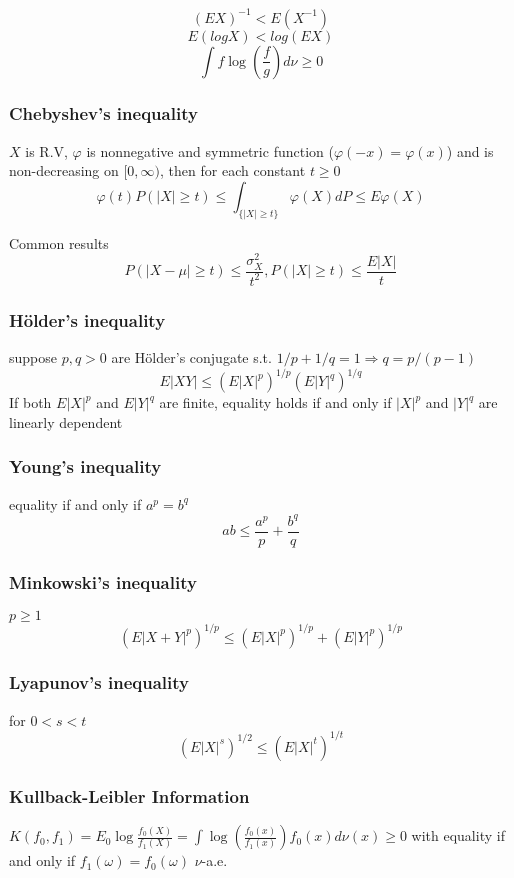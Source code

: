 $$(EX)^{-1} < E(X^{-1})$$
$$E(logX)<log(EX)$$
$$
\int f\log\left(\frac{f}{g}\right)d\nu \geq 0
$$

\subsubsection{Chebyshev's inequality}
$X$ is R.V, $\varphi$ is nonnegative and symmetric function ($\varphi(-x) = \varphi(x)$) and is non-decreasing on $[0, \infty)$, then for each constant $t \geq 0$
$$
\varphi(t) P(|X|\geq t) \leq \int_{\{|X|\geq t\}} \varphi(X) dP \leq E\varphi(X)
$$

Common results
$$
P(|X-\mu| \geq t) \leq \frac{\sigma_X^2}{t^2},
P(|X|\geq t) \leq \frac{E|X|}{t}
$$

\subsubsection{Hölder's inequality}

suppose $p, q > 0$ are Hölder's conjugate s.t. $1/p + 1/q = 1\Rightarrow q = p / (p-1)$
$$
E|XY| \leq (E|X|^p)^{1/p}(E|Y|^q)^{1/q}
$$
If both $E|X|^p$ and $E|Y|^q$ are finite, equality holds if and only if $|X|^p$ and $|Y|^q$ are linearly dependent

\subsubsection{Young's inequality} equality if and only if $a^p = b^q$
$$
ab \leq \frac{a^p}{p} + \frac{b^q}{q}
$$

\subsubsection{Minkowski's inequality} $p \geq 1$
$$
(E|X+Y|^p)^{1/p} \leq (E|X|^p)^{1/p} + (E|Y|^p)^{1/p}
$$

\subsubsection{Lyapunov's inequality} for $0 < s < t$
$$
(E|X|^s)^{1/2} \leq (E|X|^t)^{1/t}
$$

\subsubsection{Kullback-Leibler Information}

$K(f_0, f_1) = E_0 \log \frac{f_0(X)}{f_1(X)} = \int \log \left(\frac{f_0(x)}{f_1(x)}\right) f_0(x)d\nu(x) \geq 0$ with equality if and only if $f_1(\omega)=f_0(\omega)$ $\nu$-a.e.

